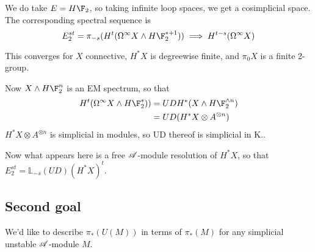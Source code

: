 \documentclass[11pt]{article}
\begin{document}
\begin{RuneBabytop}
We do take $E=H\F_2$, so taking infinite loop spaces, we get a cosimplicial space. The corresponding spectral sequence is
\[E_2^{st}=\pi_{-s}(H^t(\Omega^\infty X\wedge H\F_2^{*+1}))\implies H^{t-s}(\Omega^\infty X)\]
\begin{thm*}[Bousfield]
This converges for $X$ connective, $H^*X$ is degreewise finite, and $\pi_0X$ is a finite 2-group.
\end{thm*}
Now $X\wedge H\F_2^n$ is an EM spectrum, so that 
\begin{alignat*}{2}
H^t(\Omega^\infty X\wedge H\F_2^{*}))&=UDH^*(X\wedge H\F_2^{\wedge n})%
\\&=UD(H^*X\otimes A^{\otimes n})%
\end{alignat*}
$H^*X\otimes A^{\otimes n}$ is simplicial in modules, so UD thereof is simplicial in K..

Now what appears here is a free $\mathscr{A}$-module resolution of $H^*X$, so that $E_2^{st}=\mathbb{L}_{-s}(UD)(H^*X)^t$.
\subsection*{Second goal}
We'd like to describe $\pi_*(U(M))$ in terms of $\pi_*(M)$ for any simplicial unstable $\mathscr{A}$-module $M$.


\end{RuneBabytop}
\end{document}
